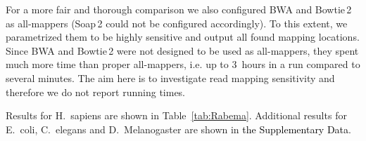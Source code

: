 \documentclass[a4,center,fleqn]{article}
\newcommand{\ie}{{i.e.}\xspace}
\begin{document}
For a more fair and thorough comparison we also configured BWA and Bowtie\,2 as all-mappers (Soap\,2 could not be configured accordingly).
To this extent, we parametrized them to be highly sensitive and output all found mapping locations.
Since BWA and Bowtie\,2 were not designed to be used as all-mappers, they spent much more time than proper all-mappers, \ie up to 3~hours in a run compared to several minutes.
The aim here is to investigate read mapping sensitivity and therefore we do not report running times.

Results for H.~sapiens are shown in Table~\ref{tab:Rabema}.
Additional results for E.~coli, C.~elegans and D.~Melanogaster are shown in \textcolor{black}{the Supplementary Data}.

\begin{table*}[t]
  \caption[Rabema benchmark results]
  {
  \label{tab:Rabema}
    {\bfseries Rabema benchmark results.}
    Rabema scores in percent
    \textcolor{black}{(average fraction of edit distance locations reported per read).}
    Large numbers show total scores in each Rabema category and small numbers show the category scores separately for reads with  errors.
    }
  \vspace{-3mm}
  \center
  \sffamily
  \resizebox{1.0\textwidth}{!}
  {
	\renewcommand{\tabcolsep}{0.8ex}
	\begin{tabular}{llcccc}
  \toprule
   

\end{tabular}}
\end{table*}
\end{document}
